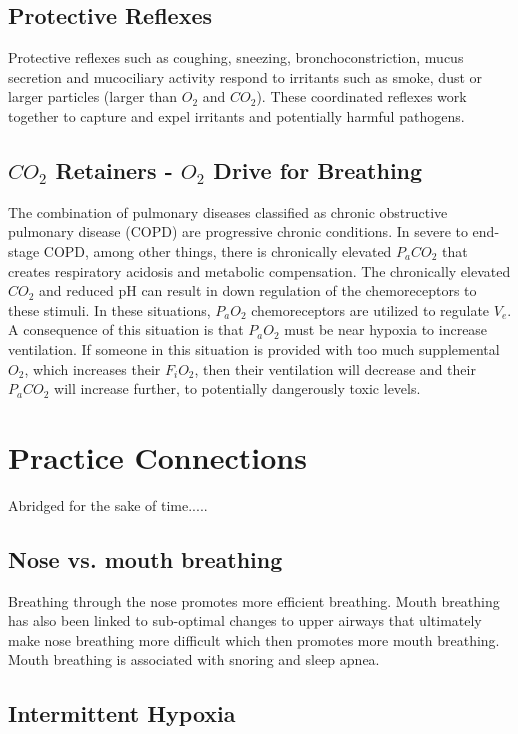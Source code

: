 \subsection{Protective Reflexes}

Protective reflexes such as coughing, sneezing, bronchoconstriction, mucus secretion and mucociliary activity respond to irritants such as smoke, dust or larger particles (larger than $O_2$ and $CO_2$). These coordinated reflexes work together to capture and expel irritants and potentially harmful pathogens.

\subsection{$CO_2$ Retainers - $O_2$ Drive for Breathing}

The combination of pulmonary diseases classified as chronic obstructive pulmonary disease (COPD) are progressive chronic conditions. In severe to end-stage COPD, among other things, there is chronically elevated $P_aCO_2$ that creates respiratory acidosis and metabolic compensation. The chronically elevated $CO_2$ and reduced pH can result in down regulation of the chemoreceptors to these stimuli. In these situations, $P_aO_2$ chemoreceptors are utilized to regulate $V_e$. A consequence of this situation is that $P_aO_2$ must be near hypoxia to increase ventilation. If someone in this situation is provided with too much supplemental $O_2$, which increases their $F_iO_2$, then their ventilation will decrease and their $P_aCO_2$ will increase further, to potentially dangerously toxic levels.

\section{Practice Connections}

Abridged for the sake of time.....

\subsection{Nose vs. mouth breathing}

Breathing through the nose promotes more efficient breathing. Mouth breathing has also been linked to sub-optimal changes to upper airways that ultimately make nose breathing more difficult which then promotes more mouth breathing. Mouth breathing is associated with snoring and sleep apnea.

\subsection{Intermittent Hypoxia}

